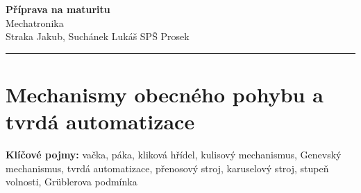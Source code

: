 \documentclass[a4paper,10pt]{article}
\begin{document}
\begin{minipage}[t]{0.75\textwidth}
    {\Huge\bfseries\color{accent} Příprava na maturitu}\\[4pt]
    {\large\color{stripeblue} Mechatronika}\\[2pt]
    \textcolor{medgray}{\small Straka Jakub, Suchánek Lukáš \quad SPŠ Prosek }
\end{minipage}
\hfill
\begin{minipage}[t]{0.22\textwidth}
    \raggedleft
\end{minipage}

\vspace{6pt}
\noindent\color{accent}\rule{\linewidth}{1.5pt}
\vspace{2pt}

\section{Mechanismy obecného pohybu a tvrdá automatizace}

\begin{pojmybox}
\textbf{Klíčové pojmy:}
vačka, páka, kliková hřídel, kulisový mechanismus, Genevský mechanismus,
tvrdá automatizace, přenosový stroj, karuselový stroj, stupeň volnosti,
Grüblerova podmínka
\end{pojmybox}
\end{document}
